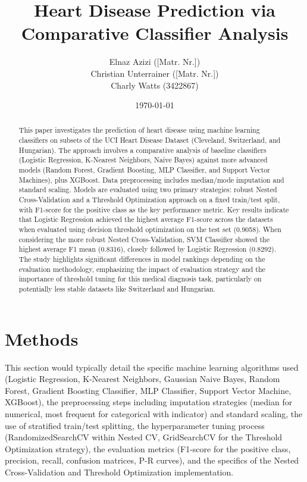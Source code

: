\documentclass{article}
\title{Heart Disease Prediction via Comparative Classifier Analysis}
\author{
    Elnaz Azizi ([Matr. Nr.]) \\ %
    Christian Unterrainer ([Matr. Nr.])\\ %
    Charly Watts (3422867)
}
\date{\today}
\begin{document}
\maketitle
\begin{abstract}
This paper investigates the prediction of heart disease using machine learning classifiers on subsets of the UCI Heart Disease Dataset (Cleveland, Switzerland, and Hungarian). The approach involves a comparative analysis of baseline classifiers (Logistic Regression, K-Nearest Neighbors, Naive Bayes) against more advanced models (Random Forest, Gradient Boosting, MLP Classifier, and Support Vector Machines), plus XGBoost. Data preprocessing includes median/mode imputation and standard scaling. Models are evaluated using two primary strategies: robust Nested Cross-Validation and a Threshold Optimization approach on a fixed train/test split, with F1-score for the positive class as the key performance metric. Key results indicate that Logistic Regression achieved the highest average F1-score across the datasets when evaluated using decision threshold optimization on the test set (0.9058). When considering the more robust Nested Cross-Validation, SVM Classifier showed the highest average F1 mean (0.8316), closely followed by Logistic Regression (0.8292). The study highlights significant differences in model rankings depending on the evaluation methodology, emphasizing the impact of evaluation strategy and the importance of threshold tuning for this medical diagnosis task, particularly on potentially less stable datasets like Switzerland and Hungarian.
\end{abstract}

\section{Methods}
This section would typically detail the specific machine learning algorithms used (Logistic Regression, K-Nearest Neighbors, Gaussian Naive Bayes, Random Forest, Gradient Boosting Classifier, MLP Classifier, Support Vector Machine, XGBoost), the preprocessing steps including imputation strategies (median for numerical, most frequent for categorical with indicator) and standard scaling, the use of stratified train/test splitting, the hyperparameter tuning process (RandomizedSearchCV within Nested CV, GridSearchCV for the Threshold Optimization strategy), the evaluation metrics (F1-score for the positive class, precision, recall, confusion matrices, P-R curves), and the specifics of the Nested Cross-Validation and Threshold Optimization implementation.
\end{document}
